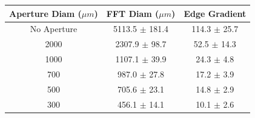 \documentclass[twocolumn,amsmath,amssymb,pra]{revtex4-2}
\begin{document}
\begin{center}
\begin{tabular}{||c | c | c||} 
 \hline
  Aperture Diam ($\mu m$) &  FFT Diam ($\mu m$) &  Edge Gradient\\ [0.5ex] 
 \hline
 No Aperture & 5113.5 $\pm$ 181.4 & 114.3 $\pm$ 25.7 \\ 
 \hline
 2000 &  2307.9 $\pm$ 98.7 & 52.5 $\pm$ 14.3\\
 \hline
 1000 &  1107.1 $\pm$ 39.9 & 24.3 $\pm$ 4.8\\
 \hline
 700 &  987.0 $\pm$ 27.8 & 17.2 $\pm$ 3.9\\
 \hline
 500 &  705.6 $\pm$ 23.1 & 14.8 $\pm$ 2.9\\
 \hline
 300 & 456.1 $\pm$ 14.1 & 10.1 $\pm$ 2.6\\
 \hline
\end{tabular}
\end{center}
\end{document}
